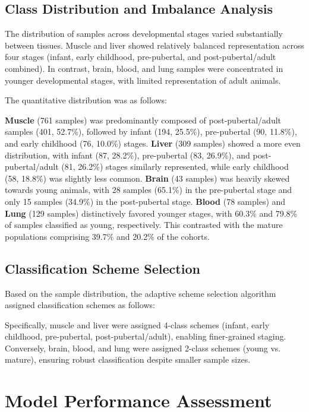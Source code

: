 \subsection{Class Distribution and Imbalance Analysis}

The distribution of samples across developmental stages varied substantially between tissues. Muscle and liver showed relatively balanced representation across four stages (infant, early childhood, pre-pubertal, and post-pubertal/adult combined). In contrast, brain, blood, and lung samples were concentrated in younger developmental stages, with limited representation of adult animals.

The quantitative distribution was as follows:

\textbf{Muscle} (761 samples) was predominantly composed of post-pubertal/adult samples (401, 52.7\%), followed by infant (194, 25.5\%), pre-pubertal (90, 11.8\%), and early childhood (76, 10.0\%) stages.
\textbf{Liver} (309 samples) showed a more even distribution, with infant (87, 28.2\%), pre-pubertal (83, 26.9\%), and post-pubertal/adult (81, 26.2\%) stages similarly represented, while early childhood (58, 18.8\%) was slightly less common.
\textbf{Brain} (43 samples) was heavily skewed towards young animals, with 28 samples (65.1\%) in the pre-pubertal stage and only 15 samples (34.9\%) in the post-pubertal stage.
\textbf{Blood} (78 samples) and \textbf{Lung} (129 samples) distinctively favored younger stages, with 60.3\% and 79.8\% of samples classified as young, respectively. This contrasted with the mature populations comprising 39.7\% and 20.2\% of the cohorts.

\subsection{Classification Scheme Selection}

Based on the sample distribution, the adaptive scheme selection algorithm assigned classification schemes as follows:

Specifically, muscle and liver were assigned 4-class schemes (infant, early childhood, pre-pubertal, post-pubertal/adult), enabling finer-grained staging. Conversely, brain, blood, and lung were assigned 2-class schemes (young vs. mature), ensuring robust classification despite smaller sample sizes.


\section{Model Performance Assessment}\label{sec:results:performance}

